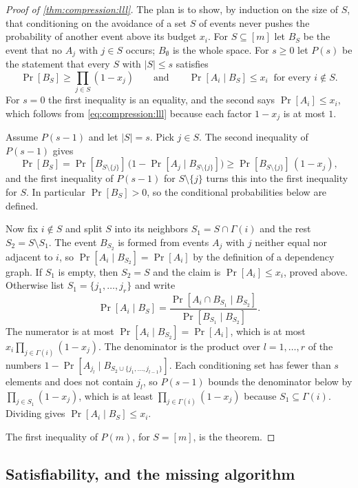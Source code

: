 \begin{refsection}
\begin{proof}[Proof of \cref{thm:compression:lll}]
The plan is to show, by induction on the size of $S$, that conditioning on the avoidance of a set $S$ of events never pushes the probability of another event above its budget $x_i$. For $S\subseteq[m]$ let $B_S$ be the event that no $A_j$ with $j\in S$ occurs; $B_\emptyset$ is the whole space. For $s\ge0$ let $P(s)$ be the statement that every $S$ with $|S|\le s$ satisfies
\[
\Pr[B_S]\ge\prod_{j\in S}(1-x_j)\qquad\text{and}\qquad\Pr[A_i\mid B_S]\le x_i\ \text{ for every } i\notin S.
\]
For $s=0$ the first inequality is an equality, and the second says $\Pr[A_i]\le x_i$, which follows from \eqref{eq:compression:lll} because each factor $1-x_j$ is at most $1$.

Assume $P(s-1)$ and let $|S|=s$. Pick $j\in S$. The second inequality of $P(s-1)$ gives
\[
\Pr[B_S]=\Pr[B_{S\setminus\{j\}}]\,\bigl(1-\Pr[A_j\mid B_{S\setminus\{j\}}]\bigr)\ge\Pr[B_{S\setminus\{j\}}]\,(1-x_j),
\]
and the first inequality of $P(s-1)$ for $S\setminus\{j\}$ turns this into the first inequality for $S$. In particular $\Pr[B_S]>0$, so the conditional probabilities below are defined.

Now fix $i\notin S$ and split $S$ into its neighbors $S_1=S\cap\Gamma(i)$ and the rest $S_2=S\setminus S_1$. The event $B_{S_2}$ is formed from events $A_j$ with $j$ neither equal nor adjacent to $i$, so $\Pr[A_i\mid B_{S_2}]=\Pr[A_i]$ by the definition of a dependency graph. If $S_1$ is empty, then $S_2=S$ and the claim is $\Pr[A_i]\le x_i$, proved above. Otherwise list $S_1=\{j_1,\dots,j_r\}$ and write
\[
\Pr[A_i\mid B_S]=\frac{\Pr[A_i\cap B_{S_1}\mid B_{S_2}]}{\Pr[B_{S_1}\mid B_{S_2}]}.
\]
The numerator is at most $\Pr[A_i\mid B_{S_2}]=\Pr[A_i]$, which is at most $x_i\prod_{j\in\Gamma(i)}(1-x_j)$. The denominator is the product over $l=1,\dots,r$ of the numbers $1-\Pr[A_{j_l}\mid B_{S_2\cup\{j_1,\dots,j_{l-1}\}}]$. Each conditioning set has fewer than $s$ elements and does not contain $j_l$, so $P(s-1)$ bounds the denominator below by $\prod_{j\in S_1}(1-x_j)$, which is at least $\prod_{j\in\Gamma(i)}(1-x_j)$ because $S_1\subseteq\Gamma(i)$. Dividing gives $\Pr[A_i\mid B_S]\le x_i$.

The first inequality of $P(m)$, for $S=[m]$, is the theorem.
\end{proof}

\subsection{Satisfiability, and the missing algorithm}\label{sec:compression:ksat}


\end{refsection}
